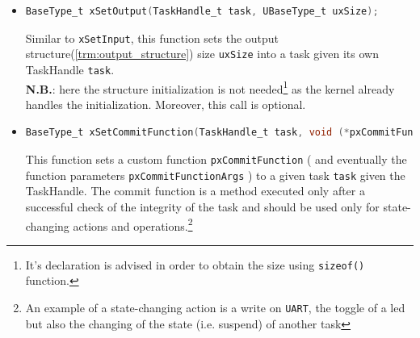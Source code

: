 \documentclass[a4paper, 12pt]{article}
\begin{document}
\begin{onehalfspace}
\begin{itemize}
{    }
    \item{
        \begin{lstlisting}[language=C]
BaseType_t xSetOutput(TaskHandle_t task, UBaseType_t uxSize);
        \end{lstlisting}
        Similar to \texttt{xSetInput}, this function sets the output structure(\ref{trm:output_structure}) size \texttt{uxSize} into a task given its own TaskHandle \texttt{task}. \\
        \textbf{N.B.}: here the structure initialization is not needed\footnote{It's declaration is advised in order to obtain the size using \texttt{sizeof()} function.} as the kernel already handles the initialization. Moreover, this call is optional.
    }
    \item {
        \begin{lstlisting}[language=C]
BaseType_t xSetCommitFunction(TaskHandle_t task, void (*pxCommitFunction)(void*), void* pxCommitFunctionArgs);
        \end{lstlisting}
        This function sets a custom function \texttt{pxCommitFunction} ( and eventually the function parameters \texttt{pxCommitFunctionArgs} ) to a given task \texttt{task} given the TaskHandle. The commit function is a method executed only after a successful check of the integrity of the task and should be used only for state-changing actions and operations.\footnote{An example of a state-changing action is a write on \texttt{UART}, the toggle of a led but also the changing of the state (i.e. suspend) of another task}
    }
\end{itemize}

\end{onehalfspace}
\end{document}
